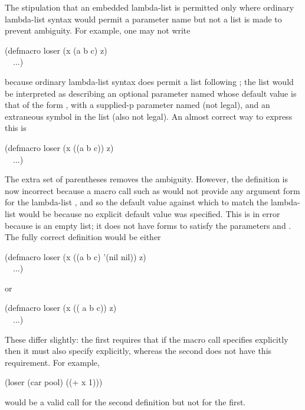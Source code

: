 \begin{defmac}
The stipulation that
an embedded lambda-list is permitted only
where ordinary lambda-list syntax would permit a parameter name
but not a list is made to prevent ambiguity.  For example,
one may not write
\begin{lisp}
(defmacro loser (x  (a b  c)  z) \\
~~...)
\end{lisp}
because ordinary lambda-list syntax does permit a list following ;
the list  would be interpreted as describing an
optional parameter named  whose default value is that of the
form , with a supplied-p parameter named  (not legal),
and an extraneous symbol  in the list (also not legal).  An almost
correct way to express this is
\begin{lisp}
(defmacro loser (x  ((a b  c))  z) \\
~~...)
\end{lisp}
The extra set of parentheses removes the ambiguity.  However, the
definition is now incorrect because a macro call such as 
would not provide any argument form for the lambda-list ,
and so the default value against which to match the lambda-list would be
{\nil} because no explicit default value was specified.  This is in error
because {\nil} is an empty list; it does not have forms to satisfy the
parameters  and .  The fully correct definition would be either
\begin{lisp}
(defmacro loser (x  ((a b  c) '(nil nil))  z) \\
~~...)
\end{lisp}
or
\begin{lisp}
(defmacro loser (x  (( a b  c))  z) \\
~~...)
\end{lisp}
These differ slightly: the first requires that if the macro call
specifies  explicitly then it must also specify  explicitly,
whereas the second does not have this requirement.  For example,
\begin{lisp}
(loser (car pool) ((+ x 1)))
\end{lisp}
would be a valid call for the second definition but not for the first.


\end{defmac}
